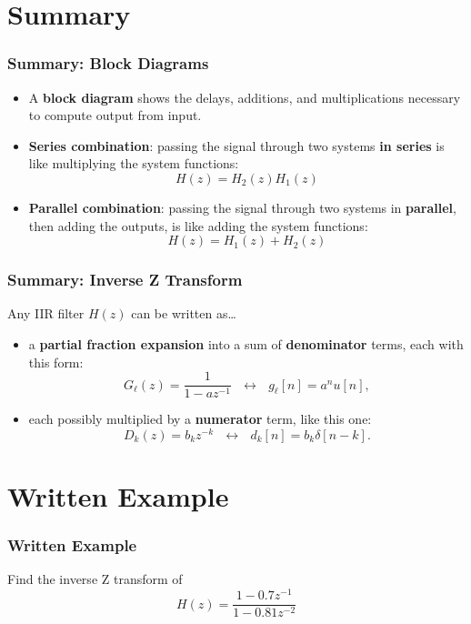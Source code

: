 \documentclass{beamer}
\begin{document}
\section[Summary]{Summary}
\setcounter{subsection}{1}

\begin{frame}
  \frametitle{Summary: Block Diagrams}
  \begin{itemize}
  \item A {\bf block diagram} shows the delays, additions, and
    multiplications necessary to compute output from input.
  \item {\bf Series combination}: passing the signal through two
    systems {\bf in series} is like multiplying the system functions:
    \[
    H(z)=H_2(z)H_1(z)
    \]
  \item {\bf Parallel combination}: passing the signal through two
    systems in {\bf parallel}, then adding the outputs, is like adding
    the system functions:
    \[
    H(z) = H_1(z)+H_2(z)
    \]
  \end{itemize}
\end{frame}
  
\begin{frame}
  \frametitle{Summary: Inverse Z Transform}

  Any IIR filter $H(z)$ can be written as\ldots
  \begin{itemize}
  \item a {\bf partial fraction expansion} into a sum of {\bf
    denominator} terms, each with this form:
    \begin{displaymath}
      G_\ell(z)=\frac{1}{1-az^{-1}}~~~\leftrightarrow~~~g_\ell[n]= a^nu[n],
    \end{displaymath}
  \item each possibly multiplied by a {\bf numerator} term, like this one:
    \begin{displaymath}
      D_k(z)=b_kz^{-k}~~~\leftrightarrow~~~d_k[n]=b_k\delta[n-k].
    \end{displaymath}
  \end{itemize}
\end{frame}

\section[Example]{Written Example}
\setcounter{subsection}{1}


\begin{frame}
  \frametitle{Written Example}

  Find the inverse Z transform of
  \[
  H(z) = \frac{1-0.7z^{-1}}{1-0.81z^{-2}}
  \]
\end{frame}
\end{document}
